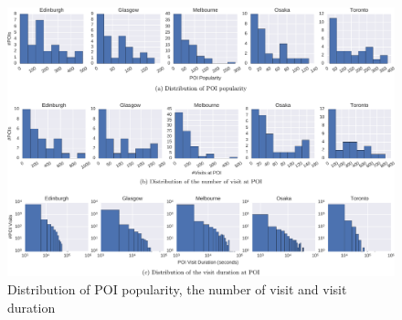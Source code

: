 \begin{figure}[t]
\includegraphics[width=\textwidth]{fig/feature_distro.pdf}
\caption{Distribution of POI popularity, the number of visit and visit duration}
\label{fig:distro}
\end{figure}
